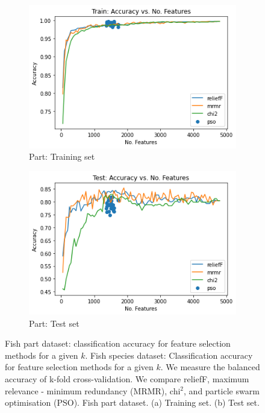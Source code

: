 \documentclass[runningheads]{llncs}
\begin{document}
\begin{figure}[htb]
\begin{subfigure}[b]{.45\linewidth}
    \includegraphics[width=\linewidth]{accuracy-features-part-train.png}
    \caption{Part: Training set}\label{fig:accuracy-features-part-train}
  \end{subfigure}
  \begin{subfigure}[b]{.45\linewidth}
    \includegraphics[width=\linewidth]{accuracy-features-part-test.png}
    \caption{Part: Test set}\label{fig:accuracy-features-part-test}
  \end{subfigure}
  \caption[Two numerical solutions]{
    Fish part dataset: classification accuracy for feature selection methods for a given $k$.
    Fish species dataset: Classification accuracy for feature selection methods for a given $k$.
    We measure the balanced accuracy of k-fold cross-validation.
    We compare reliefF, maximum relevance - minimum redundancy (MRMR), chi$^2$, and particle swarm optimisation (PSO).
    Fish part dataset. (a) Training set. (b) Test set.}
  \label{fig:animals}
\end{figure}
\end{document}
